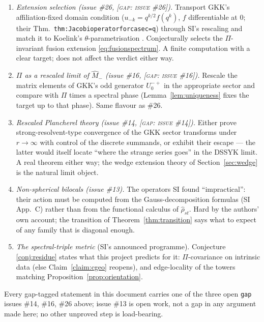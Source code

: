\documentclass[11pt,a4paper]{article}
\newcommand{\GAP}[1]{{\color{red}\textsc{[gap: issue \##1]}}}
\theoremstyle{definition}
\theoremstyle{plain}
\begin{document}
\begin{enumerate}
\item \emph{Extension selection (issue \#26, \GAP{26}).} Transport GKK's
affiliation-fixed domain condition ($u_{-k}=q^{k/2}f(q^{k})$, $f$ differentiable at $0$;
their Thm.\ \texttt{thm:Jacobioperatorforcasec=q}) through SI's rescaling and match it to
Koelink's $\theta$-parametrisation \cite{Koelink:2003oneparam}. Conjecturally selects the
$\Pi$-invariant fusion extension \eqref{eq:fusionspectrum}. A finite computation with a
clear target; does not affect the verdict either way.
\item \emph{$\Pi$ as a rescaled limit of $\hat M_{-}$ (issue \#16, \GAP{16}).} Rescale
the matrix elements of GKK's odd generator $U^{-+}_{0}$ in the appropriate sector and
compare with $\Pi$ times a spectral phase (Lemma~\ref{lem:uniqueness} fixes the target up
to that phase). Same flavour as \#26.
\item \emph{Rescaled Plancherel theory (issue \#14, \GAP{14}).} Either prove
strong-resolvent-type convergence of the GKK sector transforms under $r\to\infty$ with
control of the discrete summands, or exhibit their escape --- the latter would itself
locate ``where the strange series goes'' in the DSSYK limit. A real theorem either way;
the wedge extension theory of Section~\ref{sec:wedge} is the natural limit object.
\item \emph{Non-spherical bilocals (issue \#13).} The operators SI found
``impractical'': their action must be computed from the Gauss-decomposition formulas (SI
App.\ C) rather than from the functional calculus of $\hat\rho_{st}$. Hard by the
authors' own account; the transition of Theorem~\ref{thm:transition} says what to expect
of any family that is diagonal enough.
\item \emph{The spectral-triple metric} (SI's announced programme). Conjecture
\ref{conj:residue} states what this project predicts for it: $\Pi$-covariance on
intrinsic data (else Claim~\ref{claim:cgeo} reopens), and edge-locality of the towers
matching Proposition~\ref{prop:orientation}.
\end{enumerate}

Every gap-tagged statement in this document carries one of the three open \texttt{gap}
issues \#14, \#16, \#26 above; issue \#13 is open work, not a gap in any argument made
here; no other unproved step is load-bearing.



\end{document}
